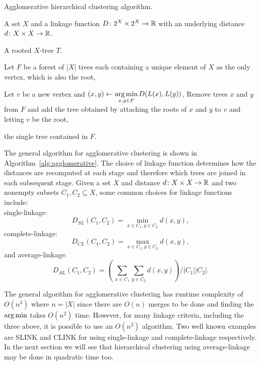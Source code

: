 \begin{algorithm}[h]
  \caption{Agglomerative hierarchical clustering algorithm.}
  \label{alg:agglomerative}

  \begin{algorithmic}
    \Require A set $X$ and a linkage function $D \colon 2^X \times 2^X \to {\mathbb R}$
    with an underlying distance $d \colon X \times X \to {\mathbb R}$.

    \Ensure  A rooted $X$-tree $T$.

    \State Let $F$ be a forest of $|X|$ trees each containing a unique element
    of $X$ as the only vertex, which is also the root,


       \State Let $v$ be a new vertex and $\displaystyle (x,y) \gets \operatorname*{arg\,min}_{x,y
         \in F} D(L(x),L(y))$,
       \State Remove trees $x$ and $y$ from $F$ and add the tree obtained by
         attaching the roots of $x$ and $y$ to $v$ and letting $v$ be the root,
    
    \EndWhile

    \State \Return the single tree contained in $F$.
    
  \end{algorithmic}
\end{algorithm}

The general algorithm for agglomerative clustering is shown in
Algorithm~\ref{alg:agglomerative}.  The choice of linkage function determines
how the distances are recomputed at each stage and therefore which trees are
joined in each subsequent stage.  Given a set $X$ and distance $d \colon X
\times X \to {\mathbb R}$ and two nonempty subsets $C_1,C_2 \subseteq X$, some common
choices for linkage functions include:\\
single-linkage:
\begin{equation*}
  \label{eq:slink}
  D_{SL}(C_1,C_2) = \min_{x \in C_1, y \in C_2} d(x,y),
\end{equation*}
complete-linkage:
\begin{equation*}
  \label{eq:clink}
  D_{CL}(C_1,C_2) = \max_{x \in C_1, y \in C_2} d(x,y),
\end{equation*}
and average-linkage:
\begin{equation*}
  \label{eq:alink}
  D_{AL}(C_1,C_2) = \left(\,\sum_{x \in C_1} \sum_{y \in C_2} d(x,y) \right) / |C_1| |C_2|.
\end{equation*}

The general algorithm for agglomerative clustering has runtime complexity of
$O(n^3)$ where $n = |X|$ since there are $O(n)$ merges to be done and finding
the $\operatorname*{arg\,min}$ takes $O(n^2)$ time.  However, for many linkage criteria,
including the three above, it is possible to use an $O(n^2)$ algorithm.  Two
well known examples are SLINK \cite{sibson1973slink} and CLINK
\cite{defays1977efficient} for using single-linkage and complete-linkage
respectively.  In the next section we will see that hierarchical clustering
using average-linkage may be done in quadratic time too.

